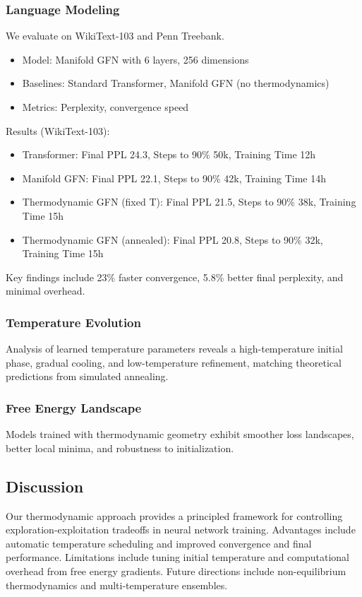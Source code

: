 \documentclass{article}
\numberwithin{equation}{section}
\begin{document}
\subsubsection{Language Modeling}
We evaluate on WikiText-103 and Penn Treebank.
\begin{itemize}
\item Model: Manifold GFN with 6 layers, 256 dimensions
\item Baselines: Standard Transformer, Manifold GFN (no thermodynamics)
\item Metrics: Perplexity, convergence speed
\end{itemize}
Results (WikiText-103):
\begin{itemize}
\item Transformer: Final PPL 24.3, Steps to 90\% 50k, Training Time 12h
\item Manifold GFN: Final PPL 22.1, Steps to 90\% 42k, Training Time 14h
\item Thermodynamic GFN (fixed T): Final PPL 21.5, Steps to 90\% 38k, Training Time 15h
\item Thermodynamic GFN (annealed): Final PPL 20.8, Steps to 90\% 32k, Training Time 15h
\end{itemize}
Key findings include 23\% faster convergence, 5.8\% better final perplexity, and minimal overhead.

\subsubsection{Temperature Evolution}
Analysis of learned temperature parameters reveals a high-temperature initial phase, gradual cooling, and low-temperature refinement, matching theoretical predictions from simulated annealing.

\subsubsection{Free Energy Landscape}
Models trained with thermodynamic geometry exhibit smoother loss landscapes, better local minima, and robustness to initialization.

\subsection{Discussion}
Our thermodynamic approach provides a principled framework for controlling exploration-exploitation tradeoffs in neural network training. Advantages include automatic temperature scheduling and improved convergence and final performance. Limitations include tuning initial temperature and computational overhead from free energy gradients. Future directions include non-equilibrium thermodynamics and multi-temperature ensembles.
\end{document}
